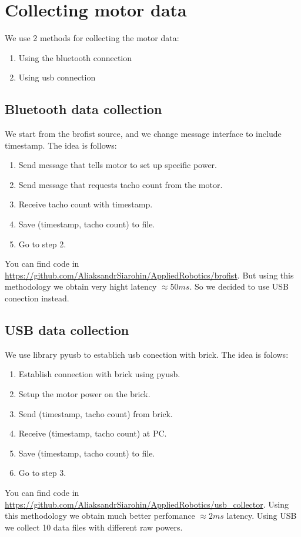 \documentclass[a4paper,12pt,oneside]{article}
\begin{document}
\section{Collecting motor data}
We use 2 methods for collecting the motor data:
\begin{enumerate}
\item Using the bluetooth connection
\item Using usb connection
\end{enumerate}

\subsection{Bluetooth data collection}
We start from the brofist source, and we change message interface to include timestamp. The idea is follows:
\begin{enumerate}
\item Send message that tells motor to set up specific power.
\item Send message that requests tacho count from the motor.
\item Receive tacho count with timestamp.
\item Save (timestamp, tacho count) to file.
\item Go to step 2.
\end{enumerate}
You can find code in \url{https://github.com/AliaksandrSiarohin/AppliedRobotics/brofist}. But using this methodology we obtain very hight latency $\approx 50ms$. So we decided to use USB conection instead.

\subsection{USB data collection}
We use library pyusb to establich usb conection with brick. The idea is folows:
\begin{enumerate}
\item Establish connection with brick using pyusb.
\item Setup the motor power on the brick.
\item Send (timestamp,  tacho count) from brick.
\item Receive (timestamp,  tacho count)  at PC.
\item Save (timestamp,  tacho count) to file.
\item Go to step 3.
\end{enumerate}
You can find code in \url{https://github.com/AliaksandrSiarohin/AppliedRobotics/usb_collector}. Using this methodology we obtain much better perfomance $\approx 2ms$ latency. Using USB we collect 10 data files with different raw powers.
\end{document}
